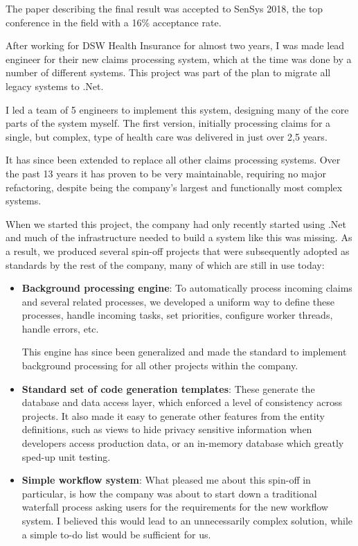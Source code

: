 \documentclass[10pt,a4paper]{../altacv}
\begin{document}
\begin{fullwidth}
\medskip\medskip

The paper describing the final result was accepted to SenSys 2018, the top conference in the field with a 16\% acceptance rate.

\bigskip\bigskip

After working for DSW Health Insurance for almost two years, I was made lead engineer for their new claims processing system, which at the time was done by a number of different systems. This project was part of the plan to migrate all legacy systems to .Net.

\medskip\medskip

I led a team of 5 engineers to implement this system, designing many of the core parts of the system myself. The first version, initially processing claims for a single, but complex, type of health care was delivered in just over 2,5 years.

\medskip\medskip

It has since been extended to replace all other claims processing systems. Over the past 13 years it has proven to be very maintainable, requiring no major refactoring, despite being the company’s largest and functionally most complex systems.

\medskip\medskip

When we started this project, the company had only recently started using .Net and much of the infrastructure needed to build a system like this was missing. As a result, we produced several spin-off projects that were subsequently adopted as standards by the rest of the company, many of which are still in use today:

\medskip\medskip

\begin{itemize}
	\item\small \textbf{Background processing engine}: To automatically process incoming claims and several related processes, we developed a uniform way to define these processes, handle incoming tasks, set priorities, configure worker threads, handle errors, etc.
	
	This engine has since been generalized and made the standard to implement background processing for all other projects within the company.
	\item\small \textbf{Standard set of code generation templates}: These generate the database and data access layer, which enforced a level of consistency across projects. It also made it easy to generate other features from the entity definitions, such as views to hide privacy sensitive information when developers access production data, or an in-memory database which greatly sped-up unit testing.
	\item\small \textbf{Simple workflow system}: What pleased me about this spin-off in particular, is how the company was about to start down a traditional waterfall process asking users for the requirements for the new workflow system. I believed this would lead to an unnecessarily complex solution, while a simple to-do list would be sufficient for us.
	

\end{itemize}
\end{fullwidth}
\end{document}
